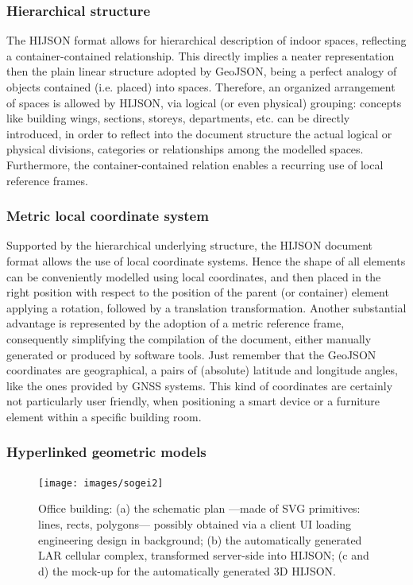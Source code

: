 \documentclass[]{egpubl}
\begin{document}
\subsubsection{Hierarchical structure}

The HIJSON format allows for hierarchical description of indoor spaces,
reflecting a container-contained relationship. This directly implies a neater
representation then the plain linear structure adopted by GeoJSON, being a
perfect analogy of objects contained (i.e. placed) into spaces. Therefore, an
organized arrangement of spaces is allowed by HIJSON, via logical (or even
physical) grouping: concepts like building wings, sections, storeys,
departments, etc. can be directly introduced, in order to reflect into the
document structure the actual logical or physical divisions, categories or
relationships among the modelled spaces. Furthermore, the container-contained
relation enables a recurring use of local reference frames.

\subsubsection{Metric local coordinate system}

Supported by the hierarchical underlying structure, the HIJSON document format
allows the use of local coordinate systems. Hence the shape of all elements
can be conveniently modelled using local coordinates, and then placed in the
right position with respect to the position of the parent (or container)
element applying a rotation, followed by a translation transformation. Another
substantial advantage is represented by the adoption of a metric reference
frame, consequently simplifying the compilation of the document, either
manually generated or produced by software tools. Just remember that the
GeoJSON coordinates are geographical, a pairs of (absolute) latitude and
longitude angles, like the ones provided by GNSS systems. This kind of
coordinates are certainly not particularly user friendly, when positioning a
smart device or a furniture element within a specific building room.

\subsubsection{Hyperlinked geometric models}

\begin{figure}[h]
 \centering
 \texttt{[image: images/sogei2]} 
 \caption{Office building: 
 (a) the schematic plan ---made of SVG primitives: 
 lines, rects, polygons--- possibly obtained via a client UI 
 loading engineering design in background;
 (b) the automatically generated LAR cellular complex, transformed 
 server-side into HIJSON; 
 (c and d) the mock-up for the automatically generated 3D HIJSON.
 }
 \label{fig:sogei}
\end{figure}
\end{document}
